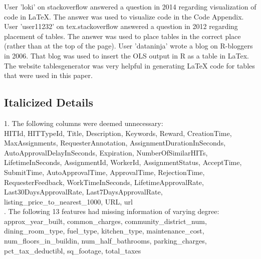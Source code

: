 \documentclass{article}
\begin{document}
User 'loki' on stackoverflow answered a question in 2014 regarding visualization of code in LaTeX. The answer was used to visualize code in the Code Appendix. User 'user11232' on tex.stackoverflow answered a question in 2012 regarding placement of tables. The answer was used to place tables in the correct place (rather than at the top of the page). User 'dataninja' wrote a blog on R-bloggers in 2006. That blog was used to insert the OLS output in R as a table in LaTex. The website tablesgenerator was very helpful in generating LaTeX code for tables that were used in this paper.

\subsection*{Italicized Details}
1. The following columns were deemed unnecessary:\\ HITId, HITTypeId, Title, Description, Keywords, Reward, CreationTime, MaxAssignments, RequesterAnnotation, AssignmentDurationInSeconds, AutoApprovalDelayInSeconds, Expiration, NumberOfSimilarHITs, LifetimeInSeconds, AssignmentId, WorkerId, AssignmentStatus, AcceptTime, SubmitTime, AutoApprovalTime, ApprovalTime, RejectionTime, RequesterFeedback, WorkTimeInSeconds, LifetimeApprovalRate, Last30DaysApprovalRate, Last7DaysApprovalRate, listing\_price\_to\_nearest\_1000, URL, url\\. The following 13 features had missing information of varying degree:\\
approx\_year\_built, common\_charges, community\_district\_num, dining\_room\_type, fuel\_type, kitchen\_type, maintenance\_cost, num\_floors\_in\_buildin, num\_half\_bathrooms, parking\_charges, pct\_tax\_deductibl, sq\_footage, total\_taxes
\end{document}
